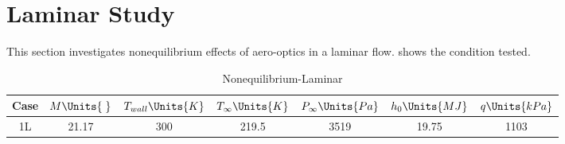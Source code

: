 \section{Laminar Study\label{ch4:laminarStudy}}

This section investigates nonequilibrium effects of aero-optics in a laminar
flow.  shows the condition tested. 

\begin{table}[H]
    \begin{center}
        \begin{tabular}{|c|c|c|c|c|c|c|}
            \hline
            Case & $M\Units{\;}$ & $T_{wall}\Units{K}$ &
            $T_{\infty}\Units{K}$ & $P_{\infty}\Units{Pa}$ &
            $h_0\Units{MJ}$ & $q\Units{kPa}$ \\
            \hline\hline
            1L\cite{Eyi2019} & 21.17 & 300 &219.5 & 3519 & 19.75 & 1103 \\ \hline
        \end{tabular}
    \caption{Nonequilibrium-Laminar \label{tab:laminarStudy}}
    \end{center}
\end{table}

